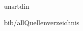 \documentclass[	12pt,
				a4paper,
				bibliography=totoc,
				listof=totoc,
				index=totoc,
				twoside,
				headsepline,
				footsepline,
				ngerman]{scrartcl}
\begin{document}

{unsrtdin} %
\raggedright


{bib/all}{Quellenverzeichnis}
\clearpage

\thispagestyle{empty}

\clearpage

\end{document}
